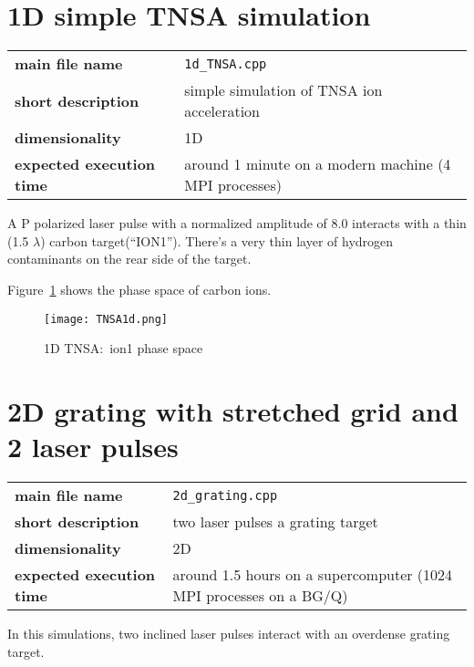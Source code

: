 \documentclass[11pt,a4paper]{report}
\begin{document}
\section{1D simple TNSA simulation}
\begin{center}
    \begin{tabular}{ l  l }
    	\textbf{main file name}          & \verb+1d_TNSA.cpp+                                     \\
    	\textbf{short description}       & simple simulation of TNSA ion acceleration             \\
    	\textbf{dimensionality}          & 1D                                                     \\
    	\textbf{expected execution time} & around 1 minute on a modern machine (4 MPI processes)
    \end{tabular}
    \end{center}
A P polarized laser pulse with a normalized amplitude of 8.0 interacts with a thin (1.5 $\lambda$) carbon target(``ION1''). There's a very thin layer of hydrogen contaminants on the rear side of the target.

Figure~\ref{pic_1dTNSA} shows the phase space of carbon ions.


    \begin{figure}[htbp]
    \centering
    \texttt{[image: TNSA1d.png]}
    \caption{1D TNSA:\ ion1 phase space}\label{pic_1dTNSA}
    \end{figure}

\section{2D grating with stretched grid and 2 laser pulses}
\begin{center}
    \begin{tabular}{ l l }
    	\textbf{main file name}           &  \verb+2d_grating.cpp+                                               \\
    	\textbf{short description}        &  two laser pulses  a grating target                                  \\
    	\textbf{dimensionality}           &  2D                                                                  \\
    	\textbf{expected execution time}  &  around 1.5 hours on a supercomputer (1024 MPI processes on a BG/Q)
    \end{tabular}
    \end{center}
In this simulations, two inclined laser pulses interact with an overdense grating target.
\end{document}
